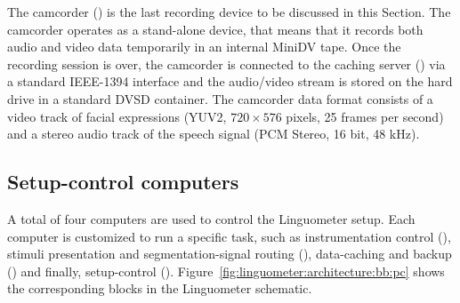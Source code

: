 The camcorder () is the last recording device to be discussed in this
Section.
The camcorder operates as a stand-alone device, that means that it records
both audio and video data temporarily in an internal MiniDV tape.
Once the recording session is over, the camcorder is connected to the caching
server () via a standard IEEE-1394 interface and the audio/video
stream is stored on the hard drive in a standard DVSD container.
The camcorder data format consists of a video track of facial expressions (YUV2,
$720\times576$ pixels, 25 frames per second) and a stereo audio track 
of the speech signal (PCM Stereo, 16 bit, 48 kHz).
\subsection{Setup-control computers}
A total of four computers are used to control the Linguometer setup.
Each computer is customized to run a specific task, such as instrumentation 
control (), stimuli presentation and segmentation-signal routing 
(), data-caching and backup () and finally, setup-control 
().
Figure~\ref{fig:linguometer:architecture:bb:pc} shows the corresponding blocks
in the Linguometer schematic.



